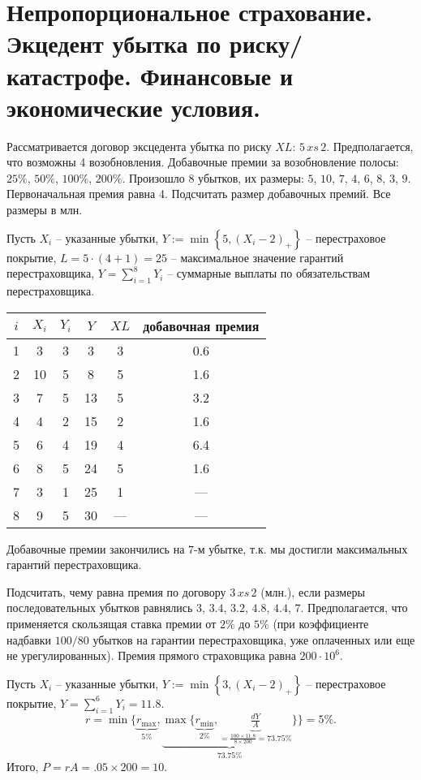 \chapter{Непропорциональное страхование. Экцедент убытка по риску/катастрофе. Финансовые и экономические условия.}
\problem{}
Рассматривается договор эксцедента убытка по риску $XL$: $5\, xs\, 2$. Предполагается, что возможны 4 возобновления. Добавочные премии за возобновление полосы: $25\%$, $50\%$, $100\%$, $200\%$.  Произошло $8$ убытков, их размеры: $5$, $10$, $7$, $4$, $6$, $8$, $3$, $9$. Первоначальная премия равна 4. 
Подсчитать размер добавочных премий. Все размеры в млн. 

\solution{}
Пусть $X_i$ -- указанные убытки, $Y:= \min\left\{5, (X_i-2)_+\right\}$ -- перестраховое покрытие, $L = 5\cdot\left(4+1\right) = 25 $ -- максимальное значение гарантий перестраховщика, $Y = \sum_{i=1}^8 Y_i$ -- суммарные выплаты по обязательствам перестраховщика.
\begin{table}[h]\centering
    \begin{tabular}{|c|c|c|c|c|c|}\hline
        $i$ & $X_i$ & $Y_i$ & $Y$ & $XL$ & добавочная премия \\\hline\hline
        1   & 3     & 3     &  3   &  3   & 0.6 \\\hline
        2   & 10    & 5     &  8   &  5   & 1.6 \\\hline
        3   & 7     & 5     &  13  &  5   & 3.2 \\\hline
        4   & 4     & 2     &  15  &  2   & 1.6 \\\hline
        5   & 6     & 4     &  19  &  4   & 6.4 \\\hline
        6   & 8     & 5     &  24  &  5   & 1.6 \\\hline
        7   & 3     & 1     &  25  &  1   & --- \\\hline
        8   & 9     & 5     &  30  & ---  & --- \\\hline
    \end{tabular}
\end{table}

Добавочные премии закончились на $7$-м убытке, т.к. мы достигли максимальных гарантий перестраховщика.






\problem{}

Подсчитать, чему равна премия по договору $3 \,xs\, 2$ (млн.), если размеры последовательных убытков равнялись $3$, $3.4$, $3.2$, $4.8$, $4.4$, $7$. 
Предполагается, что применяется скользящая ставка премии от $2\%$ до $5\%$ (при коэффициенте надбавки $100/80$ убытков на гарантии 
перестраховщика, уже оплаченных или еще не урегулированных). Премия прямого страховщика равна $200\cdot 10^6$. 

\solution{}
Пусть $X_i$ -- указанные убытки, $Y:= \min\left\{3, (X_i-2)_+\right\}$ -- перестраховое покрытие, $Y = \sum_{i=1}^6 Y_i = 11.8$.
\begin{equation}
    r = \min\{\underbrace{r_{\max}}_{5\%}, \underbrace{\max\{\underbrace{r_{\min}}_{2\%}, \underbrace{\tfrac{dY}{A}}_{=\frac{100\times 11.8}{8\times 200} = 73.75\%}\}}_{73.75\%}\} = 5\%.
\end{equation}
Итого, $P = rA = .05\times 200 = 10$.